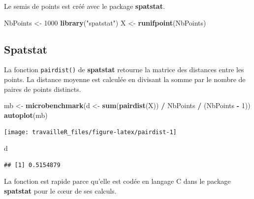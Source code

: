 \documentclass[
  12pt,
  french,
  a4paper,
  extrafontsizes,onecolumn,openright
  ]{memoir}
\newenvironment{Shaded}{\begin{snugshade}}{\end{snugshade}}
\newcommand{\DecValTok}[1]{\textcolor[rgb]{0.00,0.00,0.81}{#1}}
\newcommand{\FunctionTok}[1]{\textcolor[rgb]{0.13,0.29,0.53}{\textbf{#1}}}
\newcommand{\NormalTok}[1]{#1}
\newcommand{\OtherTok}[1]{\textcolor[rgb]{0.56,0.35,0.01}{#1}}
\newcommand{\SpecialCharTok}[1]{\textcolor[rgb]{0.81,0.36,0.00}{\textbf{#1}}}
\newcommand{\StringTok}[1]{\textcolor[rgb]{0.31,0.60,0.02}{#1}}
\begin{document}
Le semis de points est créé avec le package \textbf{spatstat}.

\scriptsize

\begin{Shaded}
\begin{Highlighting}[]
\NormalTok{NbPoints }\OtherTok{\textless{}{-}} \DecValTok{1000}
\FunctionTok{library}\NormalTok{(}\StringTok{"spatstat"}\NormalTok{)}
\NormalTok{X }\OtherTok{\textless{}{-}} \FunctionTok{runifpoint}\NormalTok{(NbPoints)}
\end{Highlighting}
\end{Shaded}

\normalsize

\subsection{Spatstat}\label{spatstat}

La fonction \texttt{pairdist()} de \textbf{spatstat} retourne la matrice des distances entre les points.
La distance moyenne est calculée en divisant la somme par le nombre de paires de points distincts.

\scriptsize

\begin{Shaded}
\begin{Highlighting}[]
\NormalTok{mb }\OtherTok{\textless{}{-}} \FunctionTok{microbenchmark}\NormalTok{(d }\OtherTok{\textless{}{-}} \FunctionTok{sum}\NormalTok{(}\FunctionTok{pairdist}\NormalTok{(X)) }\SpecialCharTok{/}\NormalTok{ NbPoints }\SpecialCharTok{/}\NormalTok{ (NbPoints }\SpecialCharTok{{-}} \DecValTok{1}\NormalTok{))}
\FunctionTok{autoplot}\NormalTok{(mb)}
\end{Highlighting}
\end{Shaded}

\begin{center}\texttt{[image: travailleR\_files/figure-latex/pairdist-1]} \end{center}

\begin{Shaded}
\begin{Highlighting}[]
\NormalTok{d}
\end{Highlighting}
\end{Shaded}

\begin{verbatim}
## [1] 0.5154879
\end{verbatim}

\normalsize

La fonction est rapide parce qu'elle est codée en langage C dans le package \textbf{spatstat} pour le cœur de ses calculs.
\end{document}
